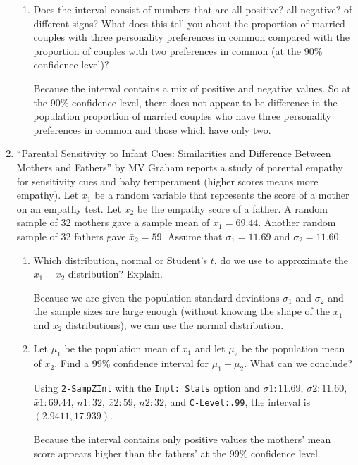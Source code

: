 \begin{enumerate}
\begin{enumerate}
	\item Does the interval consist of numbers that are all positive? all negative? of different signs? What does this tell you about the proportion of married couples with three personality preferences in common compared with the proportion of couples with two preferences in common (at the 90\% confidence level)?  
	
	{\answer Because the interval contains a mix of positive and negative values. So at the 90\% confidence level, there does not appear to be difference in the population proportion of married couples who have three personality preferences in common and those which have only two.
	}  
	\end{enumerate}
	

\item ``Parental Sensitivity to Infant Cues: Similarities and Difference Between Mothers and Fathers'' by MV Graham reports a study of parental empathy for sensitivity cues and baby temperament (higher scores means more empathy). Let $x_1$ be a random variable that represents the score of a mother on an empathy test. Let $x_2$ be the empathy score of a father. A random sample of 32 mothers gave a sample mean of $\bar{x}_1 = 69.44$. Another random sample of 32 fathers gave $\bar{x}_2 = 59$. Assume that $\sigma_1=11.69$ and $\sigma_2 = 11.60$.
	\begin{enumerate}
	\item Which distribution, normal or Student's $t$, do we use to approximate the $x_1-x_2$ distribution? Explain.  
	
	{\answer Because we are given the population standard deviations $\sigma_1$ and $\sigma_2$ and the sample sizes are large enough (without knowing the shape of the $x_1$ and $x_2$ distributions), we can use the normal distribution.
	}  
	
	\item Let $\mu_1$ be the population mean of $x_1$ and let $\mu_2$ be the population mean of $x_2$. Find a 99\% confidence interval for $\mu_1-\mu_2$. What can we conclude? 
	
	{\answer Using \texttt{2-SampZInt} with the \texttt{Inpt: Stats} option and $\sigma1: 11.69$, $\sigma2: 11.60$, $\bar{x}1: 69.44$, $n1: 32$, $\bar{x}2: 59$, $n2: 32$, and \texttt{C-Level:.99}, the interval is $(2.9411,17.939)$.  
	
	Because the interval contains only positive values the mothers' mean score appears higher than the fathers' at the 99\% confidence level.
	}  
	\end{enumerate}

\end{enumerate}

\vfill
